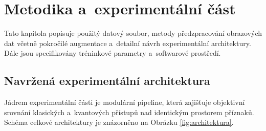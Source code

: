 \documentclass[12pt, a4paper]{report}
\begin{document}
\chapter{Metodika a~experimentální část} \label{chap:metodika}

Tato kapitola popisuje použitý datový soubor, metody předzpracování obrazových dat včetně pokročilé augmentace a~detailní návrh experimentální architektury. Dále jsou specifikovány tréninkové parametry a~softwarové prostředí.

\section{Navržená experimentální architektura} \label{sec:architektura}

Jádrem experimentální části je modulární pipeline, která zajišťuje objektivní srovnání klasických a~kvantových přístupů nad identickým prostorem příznaků. Schéma celkové architektury je znázorněno na Obrázku \ref{fig:architektura}.
\end{document}

